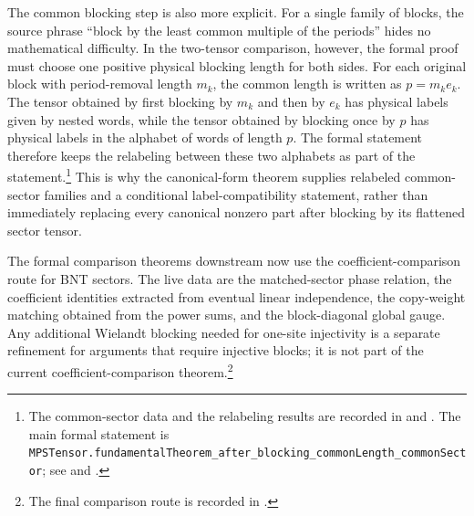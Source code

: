 \documentclass{article}
\begin{document}
The common blocking step is also more explicit. For a single family of blocks,
the source phrase ``block by the least common multiple of the periods'' hides no
mathematical difficulty. In the two-tensor comparison, however, the formal proof
must choose one positive physical blocking length for both sides. For each
original block with period-removal length $m_k$, the common length is written as
$p=m_k e_k$. The tensor obtained by first blocking by $m_k$ and then by $e_k$
has physical labels given by nested words, while the tensor obtained by
blocking once by $p$ has physical labels in the alphabet of words of length $p$.
The formal statement therefore keeps the relabeling between these two alphabets as
part of the statement.\footnote{The common-sector data and the relabeling results
are recorded in  and
. The main formal
statement is
\texttt{MPSTensor.fundamentalTheorem\_after\_blocking\_commonLength\_commonSector}; see
 and
.}
This is why the canonical-form theorem supplies relabeled common-sector
families and a conditional label-compatibility statement, rather than immediately
replacing every canonical nonzero part after blocking by its flattened sector tensor.

The formal comparison theorems downstream now use the coefficient-comparison route
for BNT sectors. The live data are the matched-sector phase relation, the
coefficient identities extracted from eventual linear independence, the
copy-weight matching obtained from the power sums, and the block-diagonal global
gauge. Any additional Wielandt blocking needed for one-site injectivity is a
separate refinement for arguments that require injective blocks; it is not part of
the current coefficient-comparison theorem.\footnote{The final comparison route is
recorded in .}
\end{document}
